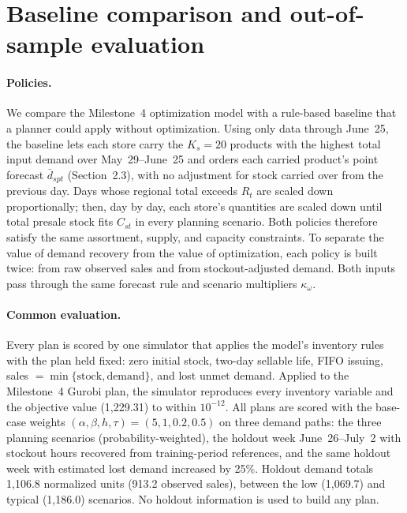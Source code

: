 \section{Baseline comparison and out-of-sample evaluation}

\paragraph{Policies.}
We compare the Milestone~4 optimization model with a rule-based baseline that a
planner could apply without optimization. Using only data through June~25, the
baseline lets each store carry the $K_s=20$ products with the highest total input
demand over May~29--June~25 and orders each carried product's point forecast
$\bar d_{spt}$ (Section~2.3), with no adjustment for stock carried over from the
previous day. Days whose regional total exceeds $R_t$ are scaled down
proportionally; then, day by day, each store's quantities are scaled down until
total presale stock fits $C_{st}$ in every planning scenario. Both policies
therefore satisfy the same assortment, supply, and capacity constraints. To
separate the value of demand recovery from the value of optimization, each policy
is built twice: from raw observed sales and from stockout-adjusted demand. Both
inputs pass through the same forecast rule and scenario multipliers
$\kappa_\omega$.

\paragraph{Common evaluation.}
Every plan is scored by one simulator that applies the model's inventory rules
with the plan held fixed: zero initial stock, two-day sellable life, FIFO issuing,
sales $=\min\{\text{stock},\text{demand}\}$, and lost unmet demand. Applied to the
Milestone~4 Gurobi plan, the simulator reproduces every inventory variable and the
objective value (1{,}229.31) to within $10^{-12}$. All plans are scored with the
base-case weights $(\alpha,\beta,h,\tau)=(5,1,0.2,0.5)$ on three demand paths:
the three planning scenarios (probability-weighted), the holdout week
June~26--July~2 with stockout hours recovered from training-period references,
and the same holdout week with estimated lost demand increased by 25\%. Holdout
demand totals 1{,}106.8 normalized units (913.2 observed sales), between the low
(1{,}069.7) and typical (1{,}186.0) scenarios. No holdout information is used to
build any plan.

